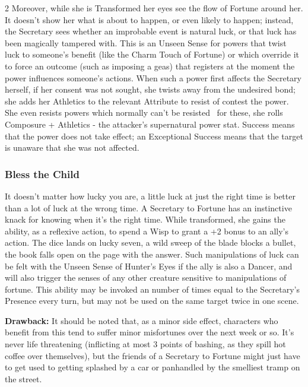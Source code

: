 \begin{multicols}{2}
Moreover, while she is Transformed her eyes see the flow of Fortune around her. It doesn't show her what is about to happen, or even likely to happen; instead, the Secretary sees whether an improbable event is natural luck, or that luck has been magically tampered with. This is an Unseen Sense for powers that twist luck to someone's benefit (like the Charm Touch of Fortune) or which override it to force an outcome (such as imposing a geas) that registers at the moment the power influences someone's actions. When such a power first affects the Secretary herself, if her consent was not sought, she twists away from the undesired bond; she adds her Athletics to the relevant Attribute to resist of contest the power. She even resists powers which normally can't be resisted \textendash\, for these, she rolls Composure + Athletics - the attacker's supernatural power stat. Success means that the power does not take effect; an Exceptional Success means that the target is unaware that she was not affected. 

\subsubsection*{Bless the Child}

It doesn’t matter how lucky you are, a little luck at just the right time is better than a lot of luck at the wrong time. A Secretary to Fortune has an instinctive knack for knowing when it's the right time. While transformed, she gains the ability, as a reflexive action, to spend a Wisp to grant a +2 bonus to an ally's action. The dice lands on lucky seven, a wild sweep of the blade blocks a bullet, the book falls open on the page with the answer. Such manipulations of luck can be felt with the Unseen Sense of Hunter's Eyes if the ally is also a Dancer, and will also trigger the senses of any other creature sensitive to manipulations of fortune. This ability may be invoked an number of times equal to the Secretary's Presence every turn, but may not be used on the same target twice in one scene.

\textbf{Drawback:} It should be noted that, as a minor side effect, characters who benefit from this tend to suffer minor misfortunes over the next week or so. It's never life threatening (inflicting at most 3 points of bashing, as they spill hot coffee over themselves), but the friends of a Secretary to Fortune might just have to get used to getting splashed by a car or panhandled by the smelliest tramp on the street. 


\end{multicols}
